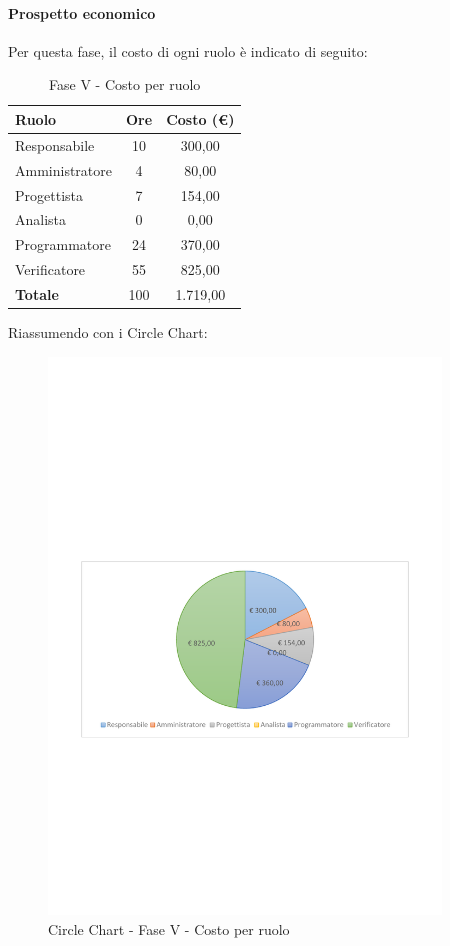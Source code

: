 \documentclass[../PianoProgetto.tex]{subfiles}
\begin{document}
	\paragraph{Prospetto economico}
					Per questa fase, il costo di ogni ruolo è indicato di seguito:
	\begin{table}[h]
		\centering
	
		\begin{tabular}{l * {2}{c}}
			\toprule
			\textbf{Ruolo} & \textbf{Ore} & \textbf{Costo (\euro{})} \\
			\midrule
			Responsabile &	10 &  300,00 \\
			Amministratore & 4 &  80,00 \\
			Progettista & 7 & 154,00 \\
			Analista & 0 & 0,00 \\
			Programmatore & 24 & 370,00 \\
			Verificatore & 55 & 825,00 \\
			\midrule		
			\textbf{Totale} & 100 & 1.719,00 \\
			\bottomrule	
		\end{tabular}
		\caption{Fase V - Costo per ruolo}
		\label{tab:faseV_costo}
	\end{table}
\vfill	
	Riassumendo con i Circle Chart:

	\begin{figure}[!h]
		\centering
		\includegraphics[width=0.93\textwidth , trim=2cm 9.5cm 2cm 11cm]{grafici/V/V-costo}
			\caption{Circle Chart - Fase V - Costo per ruolo}
		\label{fig:CircleChart-faseV_costo}
	\end{figure}
\vfill	
\newpage
\end{document}
